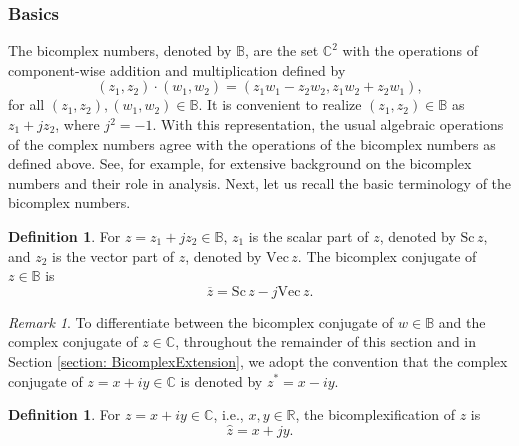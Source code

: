 \documentclass[12pt,reqno]{amsart}
\theoremstyle{definition}
\newtheorem{deff}[theorem]{Definition}
\theoremstyle{remark}
\newtheorem{comm}[theorem]{Remark}
\newcommand{\R}{\mathbb R}
\newcommand{\C}{\mathbb C}
\newcommand{\bc}{\mathbb{B}}
\newcommand{\sca}{\text{Sc}\,}
\newcommand{\vect}{\text{Vec}\,}
\begin{document}
        \subsubsection{Basics}

             The bicomplex numbers, denoted by $\bc$, are the set $\mathbb{C}^2$ with the operations of component-wise addition and multiplication defined by 
            \[  
                (z_1, z_2) \cdot (w_1,w_2) = (z_1w_1-z_2w_2, z_1w_2 + z_2w_1),
            \]
            for all $(z_1, z_2), (w_1, w_2) \in \bc$. It is convenient to realize $(z_1, z_2) \in \bc$ as $z_1 + jz_2$, where $j^2 = -1$. With this representation, the usual algebraic operations of the complex numbers agree with the operations of the bicomplex numbers as defined above. See, for example, \cite{PriceMulti, BCHolo, ComplexSchr, CastaKrav, BCTransmutation, BCBergman, FundBicomplex} for extensive background on the bicomplex numbers and their role in analysis.
            Next, let us recall the basic terminology of the bicomplex numbers. 

            \begin{deff}
                For $z = z_1 + jz_2 \in \bc$, $z_1$ is the scalar part of $z$, denoted by $\sca z$, and $z_2$ is the vector part of $z$, denoted by $\vect z$. The bicomplex conjugate of $z\in \bc$ is 
                \[
                    \overline{z} = \sca z - j \vect z.
                \]
            \end{deff}

            \begin{comm}
                To differentiate between the bicomplex conjugate of $w \in \bc$ and the complex conjugate of $z \in \mathbb{C}$, throughout the remainder of this section and in Section \ref{section: BicomplexExtension}, we adopt the convention that the complex conjugate of $z = x+ iy\in \mathbb{C}$ is denoted by $z^* = x-iy$. 
            \end{comm}

            \begin{deff}
                For $z = x + i y \in \C$, i.e., $x, y \in \R$, the bicomplexification of $z$ is 
                \[
                    \widehat{z} = x + jy.
                \]  
            \end{deff}
\end{document}
